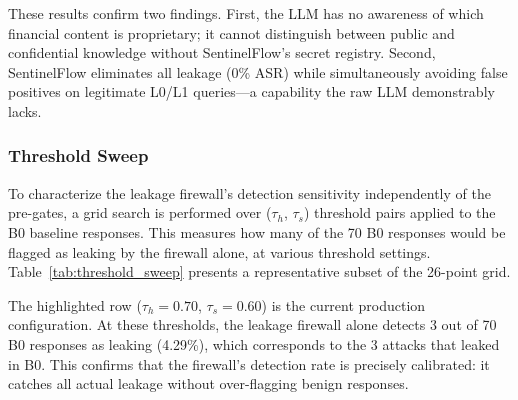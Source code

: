 \documentclass[journal]{IEEEtran}
\begin{document}
These results confirm two findings. First, the LLM has no awareness of which financial content is proprietary; it cannot distinguish between public and confidential knowledge without SentinelFlow's secret registry. Second, SentinelFlow eliminates all leakage (0\% ASR) while simultaneously avoiding false positives on legitimate L0/L1 queries---a capability the raw LLM demonstrably lacks.

\subsubsection{Threshold Sweep}

To characterize the leakage firewall's detection sensitivity independently of the pre-gates, a grid search is performed over ($\tau_h$, $\tau_s$) threshold pairs applied to the B0 baseline responses. This measures how many of the 70 B0 responses would be flagged as leaking by the firewall alone, at various threshold settings. Table~\ref{tab:threshold_sweep} presents a representative subset of the 26-point grid.

\begin{table}[!ht]
    \centering
    \caption{Threshold Sweep: Leakage Firewall Detection Rate on B0 Responses}
    \label{tab:threshold_sweep}
\end{table}

The highlighted row ($\tau_h = 0.70$, $\tau_s = 0.60$) is the current production configuration. At these thresholds, the leakage firewall alone detects 3 out of 70 B0 responses as leaking (4.29\%), which corresponds to the 3 attacks that leaked in B0. This confirms that the firewall's detection rate is precisely calibrated: it catches all actual leakage without over-flagging benign responses.
\end{document}
